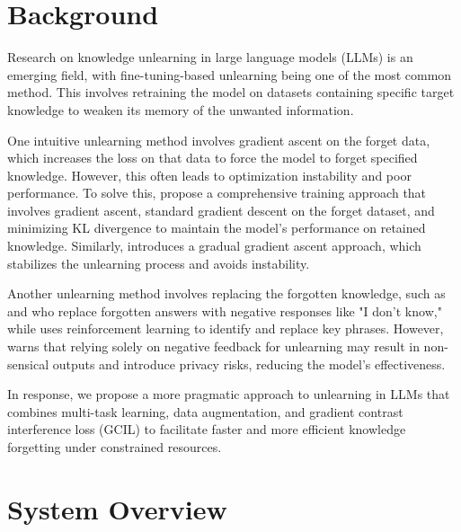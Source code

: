 \documentclass[11pt]{article}
\begin{document}
\section{Background}

Research on knowledge unlearning in large language models (LLMs) is an emerging field, with fine-tuning-based unlearning being one of the most common method. This involves retraining the model on datasets containing specific target knowledge to weaken its memory of the unwanted information.

One intuitive unlearning method involves gradient ascent on the forget data, which increases the loss on that data to force the model to forget specified knowledge. However, this often leads to optimization instability and poor performance. To solve this, \citet{veldanda2024llm} propose a comprehensive training approach that involves gradient ascent, standard gradient descent on the forget dataset, and minimizing KL divergence to maintain the model’s performance on retained knowledge. Similarly, \citet{jang2022knowledge} introduces a gradual gradient ascent approach, which stabilizes the unlearning process and avoids instability. 

Another unlearning method involves replacing the forgotten knowledge, such as \citet{choi2024snap} and \citet{shi2024ulmr} who replace forgotten answers with negative responses like "I don't know," while \citet{eldan2023s} uses reinforcement learning to identify and replace key phrases. However, \citet{mekala2024alternate} warns that relying solely on negative feedback for unlearning may result in non-sensical outputs and introduce privacy risks, reducing the model's effectiveness.

In response, we propose a more pragmatic approach to unlearning in LLMs that combines multi-task learning, data augmentation, and gradient contrast interference loss (GCIL) to facilitate faster and more efficient knowledge forgetting under constrained resources.



\section{System Overview}
\end{document}
